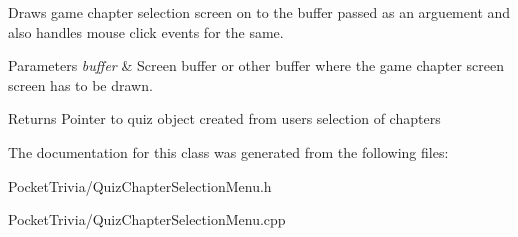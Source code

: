Draws game chapter selection screen on to the buffer passed as an arguement and also handles mouse click events for the same. 


\begin{DoxyParams}{Parameters}
{\em buffer} & Screen buffer or other buffer where the game chapter screen screen has to be drawn. \\
\hline
\end{DoxyParams}
\begin{DoxyReturn}{Returns}
Pointer to quiz object created from user\textquotesingle{}s selection of chapters 
\end{DoxyReturn}


The documentation for this class was generated from the following files\+:\begin{DoxyCompactItemize}
\item 
Pocket\+Trivia/Quiz\+Chapter\+Selection\+Menu.\+h\item 
Pocket\+Trivia/Quiz\+Chapter\+Selection\+Menu.\+cpp\end{DoxyCompactItemize}

